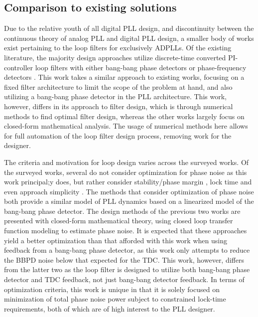\subsection{Comparison to existing solutions}
Due to the relative youth of all digital PLL design, and discontinuity between the continuous theory of analog PLL and digital PLL design, a smaller body of works exist pertaining to the loop filters for exclusively ADPLLs. Of the existing literature, the majority design approaches utilize discrete-time converted PI-controller loop filters with either bang-bang phase detectors \cite{kratyuk_2007}\cite{safwat_ghoneima_ismail_2011}\cite{zanuso_2009}\cite{xu_abidi_2017} or phase-frequency detectors \cite{kumm_klingbeil_zipf_2010}\cite{chau_chen_2009}. This work takes a similar approach to existing works, focusing on a fixed filter architecture to limit the scope of the problem at hand, and also utilizing a bang-bang phase detector in the PLL architecture. This work, however, differs in its approach to filter design, which is through numerical methods to find optimal filter design, whereas the other works largely focus on closed-form mathematical analysis. The usage of numerical methods here allows for full automation of the loop filter design process, removing work for the designer. 

The criteria and motivation for loop design varies across the surveyed works. Of the surveyed works, several \cite{kratyuk_2007}\cite{kumm_klingbeil_zipf_2010}\cite{chau_chen_2009}\cite{safwat_ghoneima_ismail_2011} do not consider optimization for phase noise as this work principal;y does, but rather consider stability/phase margin \cite{kratyuk_2007}\cite{kumm_klingbeil_zipf_2010}\cite{safwat_ghoneima_ismail_2011}, lock time \cite{chau_chen_2009}\cite{safwat_ghoneima_ismail_2011} and even approach simplicity \cite{kumm_klingbeil_zipf_2010}. The methods that consider optimization of phase noise \cite{zanuso_2009}\cite{xu_abidi_2017} both provide a similar model of PLL dynamics based on a linearized model of the bang-bang phase detector. The design methods of the previous two works are presented with closed-form mathematical theory, using closed loop transfer function modeling to estimate phase noise. It is expected that these approaches yield a better optimization than that afforded with this work when using feedback from a bang-bang phase detector, as this work only attempts to reduce the BBPD noise below that expected for the TDC. This work, however, differs from the latter two as the loop filter is designed to utilize both bang-bang phase detector and TDC feedback, not just bang-bang detector feedback. In terms of optimization criteria, this work is unique in that it is solely focused on minimization of total phase noise power subject to constrained lock-time requirements, both of which are of high interest to the PLL designer.

